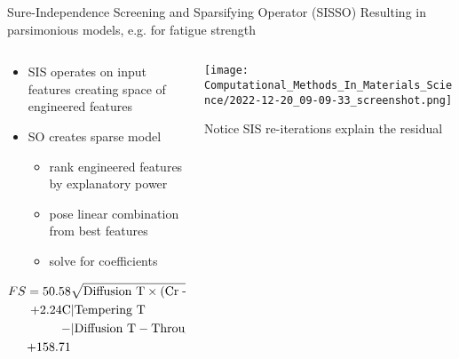 \documentclass[10pt, aspectratio=169, presentation]{beamer}
\begin{document}
\begin{frame}[label={sec:org5671a7a}]{Sure-Independence Screening and Sparsifying Operator (SISSO)}
Resulting in parsimonious models, e.g. for fatigue strength\autocite{he-2021-learn-inter}
\begin{columns}
\begin{column}{0.45\columnwidth}
\begin{itemize}
\item SIS operates on input features creating space of engineered features
\item SO creates sparse model
\begin{itemize}
\item rank engineered features by explanatory power
\item pose linear combination from best features
\item solve for coefficients
\end{itemize}
\end{itemize}

\begin{align*}
FS = 50.58 &\sqrt{\mbox{Diffusion T} \times (\ce{Cr} + \ce{Ni})}\\
 + 2.24 \ce{C} &|\mbox{Tempering T}\\
 - &|\mbox{Diffusion T} - \mbox{Through-Harden T}||\\
 + 158.71
\end{align*}
\end{column}

\begin{column}{0.55\columnwidth}
\begin{center}
\texttt{[image: Computational\_Methods\_In\_Materials\_Science/2022-12-20\_09-09-33\_screenshot.png]}
\end{center}
Notice SIS re-iterations explain the residual\autocite{ghiringhelli-2017-learn-physic}
\end{column}
\end{columns}
\end{frame}
\end{document}
